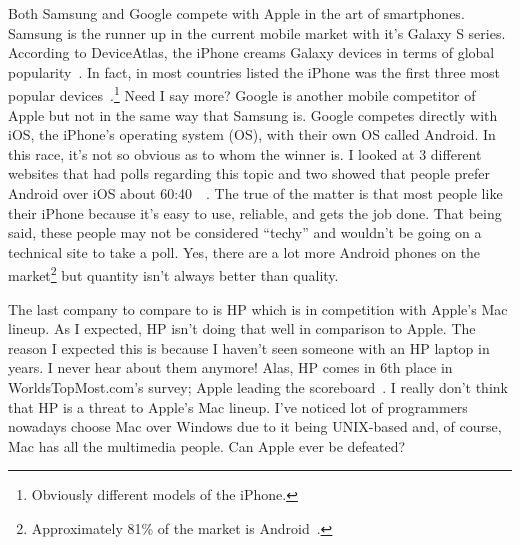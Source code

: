 \documentclass[12pt,a4paper,titlepage]{article}
\begin{document}
Both Samsung and Google compete with Apple in the art of smartphones. Samsung is
the runner up in the current mobile market with it's Galaxy S series. According
to DeviceAtlas, the iPhone creams Galaxy devices in terms of global
popularity~\cite{smartphones}. In fact, in most countries listed the iPhone was
the first three most popular devices~\cite{smartphones}.\footnote{Obviously
  different models of the iPhone.} Need I say more? Google is another mobile
competitor of Apple but not in the same way that Samsung is. Google competes
directly with iOS, the iPhone's operating system (OS), with their own OS called
Android. In this race, it's not so obvious as to whom the winner is. I looked at
3 different websites that had polls regarding this topic and two showed that
people prefer Android over iOS about 60:40~\cite{poll1}~\cite{poll2}. The true
of the matter is that most people like their iPhone because it's easy to use,
reliable, and gets the job done. That being said, these people may not be
considered ``techy'' and wouldn't be going on a technical site to take a
poll. Yes, there are a lot more Android phones on the
market\footnote{Approximately 81\% of the market is Android~\cite{verge}.} but
quantity isn't always better than quality.

The last company to compare to is HP which is in competition with Apple's Mac
lineup. As I expected, HP isn't doing that well in comparison to Apple. The
reason I expected this is because I haven't seen someone with an HP laptop in
years. I never hear about them anymore! Alas, HP comes in 6th place in
WorldsTopMost.com's survey; Apple leading the scoreboard~\cite{most}. I really
don't think that HP is a threat to Apple's Mac lineup. I've noticed lot of
programmers nowadays choose Mac over Windows due to it being UNIX-based and, of
course, Mac has all the multimedia people. Can Apple ever be defeated?

\newpage
\end{document}
